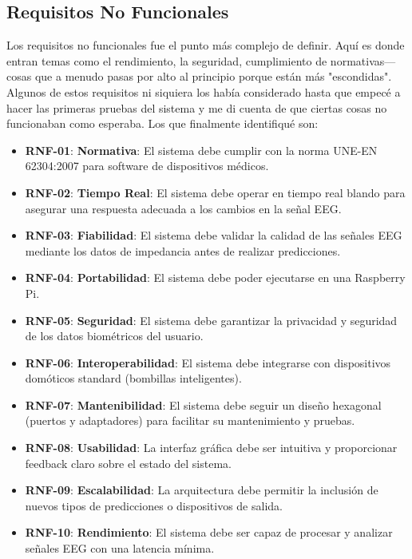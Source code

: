 \newpage

\subsection{Requisitos No Funcionales}

Los requisitos no funcionales fue el punto más complejo de definir. Aquí es donde entran temas como el rendimiento, la seguridad, cumplimiento de normativas—cosas que a menudo pasas por alto al principio porque están más "escondidas". Algunos de estos requisitos ni siquiera los había considerado hasta que empecé a hacer las primeras pruebas del sistema y me di cuenta de que ciertas cosas no funcionaban como esperaba. Los que finalmente identifiqué son:

\begin{itemize}
    \item \textbf{RNF-01}: \textbf{Normativa}: El sistema debe cumplir con la norma UNE-EN 62304:2007 para software de dispositivos médicos.\label{rnf-01}
    \item \textbf{RNF-02}: \textbf{Tiempo Real}: El sistema debe operar en tiempo real blando para asegurar una respuesta adecuada a los cambios en la señal EEG.\label{rnf-02}
    \item \textbf{RNF-03}: \textbf{Fiabilidad}: El sistema debe validar la calidad de las señales EEG mediante los datos de impedancia antes de realizar predicciones.\label{rnf-03}
    \item \textbf{RNF-04}: \textbf{Portabilidad}: El sistema debe poder ejecutarse en una Raspberry Pi.\label{rnf-04}
    \item \textbf{RNF-05}: \textbf{Seguridad}: El sistema debe garantizar la privacidad y seguridad de los datos biométricos del usuario.\label{rnf-05}
    \item \textbf{RNF-06}: \textbf{Interoperabilidad}: El sistema debe integrarse con dispositivos domóticos standard (bombillas inteligentes).\label{rnf-06}
    \item \textbf{RNF-07}: \textbf{Mantenibilidad}: El sistema debe seguir un diseño hexagonal (puertos y adaptadores) para facilitar su mantenimiento y pruebas.\label{rnf-07}
    \item \textbf{RNF-08}: \textbf{Usabilidad}: La interfaz gráfica debe ser intuitiva y proporcionar feedback claro sobre el estado del sistema.\label{rnf-08}
    \item \textbf{RNF-09}: \textbf{Escalabilidad}: La arquitectura debe permitir la inclusión de nuevos tipos de predicciones o dispositivos de salida.\label{rnf-09}
    \item \textbf{RNF-10}: \textbf{Rendimiento}: El sistema debe ser capaz de procesar y analizar señales EEG con una latencia mínima.\label{rnf-10}
\end{itemize}

